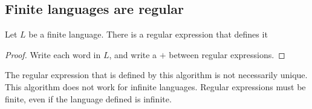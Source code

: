 \subsection{Finite languages are regular}
\begin{theorem}
    Let \(L\) be a finite language. There is a regular expression that defines it
\end{theorem}
\begin{proof}
    Write each word in \(L\), and write a \(+\) between regular expressions.
\end{proof}
The regular expression that is defined by this algorithm is not necessarily unique. This algorithm does not work for infinite languages. Regular expressions must be finite, even if the language defined is infinite.
